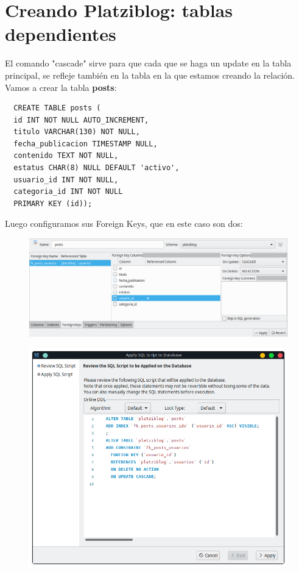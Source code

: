 \documentclass{article}
\begin{document}
\section{Creando Platziblog: tablas dependientes}%
El comando "cascade" sirve para que cada que se haga un update en la tabla
principal, se refleje también en la tabla en la que estamos creando la
relación.\\

Vamos a crear la tabla \textbf{posts}:\\

\begin{verbatim}
  CREATE TABLE posts (
  id INT NOT NULL AUTO_INCREMENT,
  titulo VARCHAR(130) NOT NULL,
  fecha_publicacion TIMESTAMP NULL,
  contenido TEXT NOT NULL,
  estatus CHAR(8) NULL DEFAULT 'activo',
  usuario_id INT NOT NULL,
  categoria_id INT NOT NULL
  PRIMARY KEY (id));
\end{verbatim}

\newpage

Luego configuramos sus Foreign Keys, que en este caso son dos:\\

\begin{figure}[h!]
  \centering
  \includegraphics[scale=0.55]{./Pictures/068_fk.png}
\end{figure}


\begin{figure}[h!]
  \centering
  \includegraphics[scale=0.55]{./Pictures/069_fk_confirm.png}
\end{figure}
\end{document}
